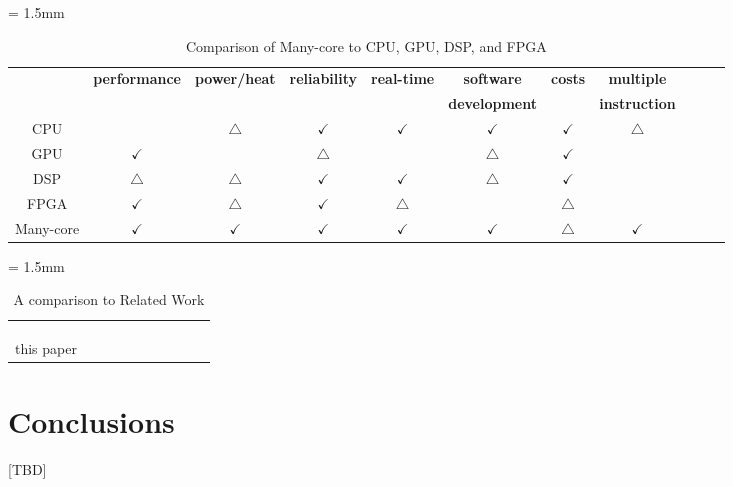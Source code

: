 \documentclass{sig-alternate-05-2015}
\begin{document}
\renewcommand{\arraystretch}{2.0}
\begin{table}[t]
  \caption{\label{tb:comparison_manu-core}
    Comparison of Many-core to CPU, GPU, DSP, and FPGA}
  \centering
  \scriptsize	                    %
  \tabcolsep = 1.5mm              %
  \begin{tabular}{c|cccccccccc}
    \hline
    & \multirow{2}{*}{\textbf{performance}} & \multirow{2}{*}{\textbf{power/heat}} & \multirow{2}{*}{\textbf{reliability}} & \multirow{2}{*}{\textbf{real-time}} & \textbf{software} & \multirow{2}{*}{\textbf{costs}} & \textbf{multiple}\\
    &&&&& \textbf{development} && \textbf{instruction} \\
    \hline
    \hline
    CPU & & \(\bigtriangleup\) & \(\checkmark\) & \(\checkmark\) & \(\checkmark\) & \(\checkmark\) & \(\bigtriangleup\) \\
    GPU & \(\checkmark\) &  & \(\bigtriangleup\) &  & \(\bigtriangleup\) & \(\checkmark\)\\
    DSP & \(\bigtriangleup\) & \(\bigtriangleup\) & \(\checkmark\) & \(\checkmark\) & \(\bigtriangleup\) & \(\checkmark\) & \\
    FPGA & \(\checkmark\) & \(\bigtriangleup\) & \(\checkmark\) & \(\bigtriangleup\) &  & \(\bigtriangleup\) & \\
    Many-core & \(\checkmark\) & \(\checkmark\) & \(\checkmark\) & \(\checkmark\) & \(\checkmark\) & \(\bigtriangleup\) & \(\checkmark\) \\
    \hline
  \end{tabular}
  \vspace{-5mm}
\end{table}


\renewcommand{\arraystretch}{2.0}
\begin{table}[t]
  \caption{\label{tb:comparison_relatedwork}
    A comparison to Related Work}
  \centering
  \scriptsize	                    %
  \tabcolsep = 1.5mm              %
  \begin{tabular}{c|ccccccccc}
    \hline
    &  &  &  &  &  & \\
    \hline
    \hline
    \cite{saidi2015shift} &  &  &  &  &  & \\
    \cite{perret2016mapping} &  &  &  &  &  & \\
    \cite{becker2016contention} &  &  &  &  &  & \\
    this paper &  &  &  &  &  & \\
    \hline
  \end{tabular}
  \vspace{-5mm}
\end{table}


\section{Conclusions}
\label{sec:conclusion}
[TBD]



\end{document}
